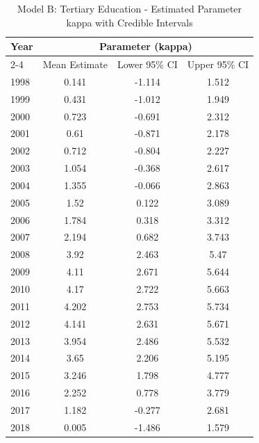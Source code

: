 \begin{landscape}
\begin{table}[htbp]
\centering
\caption{Model B: Tertiary Education - Estimated Parameter kappa  with Credible Intervals}
\label{tab:Fparameters_k8}
\begin{tabular}{@{}lccc@{}}
\toprule
Year & \multicolumn{3}{c}{Parameter (kappa)} \\
\cmidrule(lr){2-4}
      & Mean Estimate & Lower 95\% CI & Upper 95\% CI \\
\midrule
1998 & 0.141 & -1.114 & 1.512 \\
1999 & 0.431 & -1.012 & 1.949 \\
2000 & 0.723 & -0.691 & 2.312 \\
2001 & 0.61 & -0.871 & 2.178 \\
2002 & 0.712 & -0.804 & 2.227 \\
2003 & 1.054 & -0.368 & 2.617 \\
2004 & 1.355 & -0.066 & 2.863 \\
2005 & 1.52 & 0.122 & 3.089 \\
2006 & 1.784 & 0.318 & 3.312 \\
2007 & 2.194 & 0.682 & 3.743 \\
2008 & 3.92 & 2.463 & 5.47 \\
2009 & 4.11 & 2.671 & 5.644 \\
2010 & 4.17 & 2.722 & 5.663 \\
2011 & 4.202 & 2.753 & 5.734 \\
2012 & 4.141 & 2.631 & 5.671 \\
2013 & 3.954 & 2.486 & 5.532 \\
2014 & 3.65 & 2.206 & 5.195 \\
2015 & 3.246 & 1.798 & 4.777 \\
2016 & 2.252 & 0.778 & 3.779 \\
2017 & 1.182 & -0.277 & 2.681 \\
2018 & 0.005 & -1.486 & 1.579 \\
\bottomrule
\end{tabular}
\end{table}
\end{landscape}